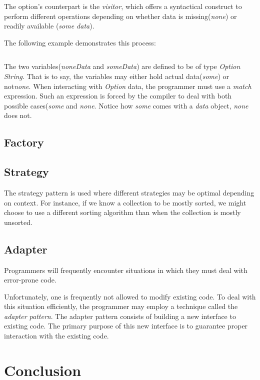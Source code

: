 \documentclass{article}
\begin{document}
The option's counterpart is the {\em visitor}, which offers a syntactical construct to perform different operations depending on whether data
is missing({\em none}) or readily available ({\em some data}).

The following example demonstrates this process:

\begin{lstlisting}[language=Python]
\end{lstlisting}

The two variables({\em noneData} and {\em someData}) are defined to be of type {\em Option String}.
That is to say, the variables may either hold actual data({\em some}) or not{\em none}.
When interacting with {\em Option} data, the programmer must use a {\em match} expression.
Such an expression is forced by the compiler to deal with both possible cases({\em some} and {\em none}.
Notice how {\em some} comes with a {\em data} object, {\em none} does not.

\subsection{Factory}
\subsection{Strategy}
The strategy pattern is used where different strategies may be optimal depending on context.
For instance, if we know a collection to be mostly sorted, we might choose to use a different sorting algorithm than when the collection is mostly unsorted.


\subsection{Adapter}
Programmers will frequently encounter situations in which they must deal with error-prone code.

Unfortunately, one is frequently not allowed to modify existing code.
To deal with this situation efficiently, the programmer may employ a technique called the {\em adapter pattern}.
The adapter pattern consists of building a new interface to existing code.
The primary purpose of this new interface is to guarantee proper interaction with the existing code.

\newpage

\section{Conclusion}
\end{document}
